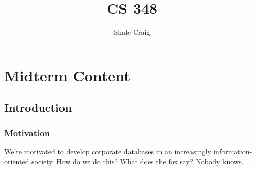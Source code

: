 \ifdefined\isphone
  
\else
  
\fi

\usepackage{listings}

\DeclarePairedDelimiter{\ceil}{\lceil}{\rceil}
\DeclarePairedDelimiter{\floor}{\lfloor}{\rfloor}

\title{CS 348}

\author{Shale Craig}

\lstset{language=SQL}


    \maketitle

    \tableofcontents

    \mainmatter
    \part{Midterm Content} %
    \label{prt:midterm_ _content_}
        \chapter{Introduction} %
        \label{cha:introduction}
            \section{Motivation} %
            \label{sec:motivation}
                We're motivated to develop corporate databases in an increasingly information-oriented society.
                How do we do this? What does the fox say? Nobody knows.
